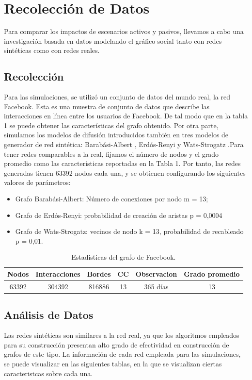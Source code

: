 \documentclass{article}
\begin{document}
\newpage
\section{Recolección de Datos}
Para comparar los impactos de escenarios activos y pasivos, llevamos a cabo una investigación basada en datos modelando el gráfico social tanto con redes sintéticas como con redes reales.

 \subsection{Recolección}
Para las simulaciones, se utilizó un conjunto de datos del mundo real, la red Facebook. Esta es una muestra de \cite[WOSN2009 Viswanath 2009]{viswanath-2009-activity} conjunto de datos que describe las interacciones en línea entre los usuarios de Facebook. De tal modo que en la tabla 1 se puede obtener las características del grafo obtenido.
Por otra parte, simulamos los modelos de difusión introducidos también en tres modelos de generador de red sintética: Barabási-Albert \cite{barabasi:1999}, Erdós-Renyi \cite{erdos:1959} y Wats-Strogatz \cite{watts:1998}.Para tener redes comparables a la real, fijamos el número de nodos y el grado promedio como las características reportadas en la Tabla 1.
Por tanto, las redes generadas tienen 63392 nodos cada una, y se obtienen configurando los siguientes valores de parámetros:

\begin{itemize}
\item Grafo Barabási-Albert: Número de conexiones por nodo m = 13;
\item Grafo de Erdós-Renyi: probabilidad de creación de aristas p = 0,0004
\item Grafo de Wats-Strogatz: vecinos de nodo k = 13, probabilidad de recableado p = 0,01.
\end{itemize}

\begin{table}[h]
	\begin{tabular}{|c|c|c|c|c|c|}
		\hline
		Nodos & Interacciones & Bordes & CC & Observacion & Grado promedio \\
		\hline
		63392 & 304392 & 816886 & 13 & 365 días & 13 \\
		\hline
	\end{tabular}
	\label{tab:table1}
	\caption{Estadisticas del grafo de Facebook.}
\end{table}

 \subsection{Análisis de Datos}	
Las redes sintéticas son similares a la red real, ya que los algoritmos empleados para su construcción presentan alto grado de efectividad en construcción de grafos de este tipo. La información de cada red empleada para las simulaciones, se puede visualizar en las siguientes tablas, en la que se visualizan ciertas caracteristcas sobre cada una.
	
\end{document}
